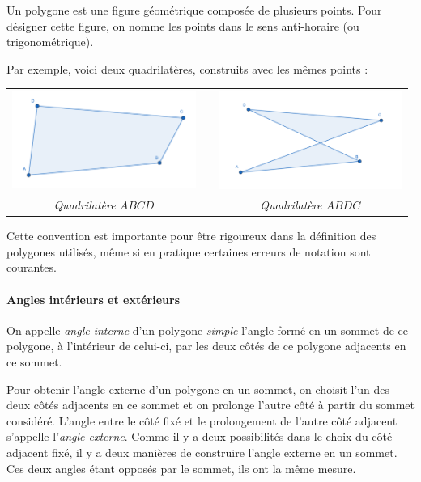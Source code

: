 \documentclass[a4paper, twoside]{article}
\begin{document}
Un polygone est une figure géométrique composée de plusieurs points.
Pour désigner cette figure, on nomme les points dans le sens anti-horaire (ou trigonométrique).

Par exemple, voici deux quadrilatères, construits avec les mêmes points :

\begin{center}
	\begin{tabular}{ccc}
		\includegraphics[width=6cm]{Image/Polygone ABCD.png} &               & \includegraphics[width=6cm]{Image/Polygone ABDC.png} \\
		\textit{Quadrilatère $ABCD$}                         & \phantom{cou} & \textit{Quadrilatère $ABDC$}                         \\
	\end{tabular}
\end{center}

Cette convention est importante pour être rigoureux dans la définition des polygones utilisés,
même si en pratique certaines erreurs de notation sont courantes.

\paragraph*{Angles intérieurs et extérieurs}

On appelle \emph{angle interne} d'un polygone \textit{simple}
l'angle formé en un sommet de ce polygone,
à l'intérieur de celui-ci,
par les deux côtés de ce polygone adjacents en ce sommet.

Pour obtenir l'angle externe d'un polygone en un sommet,
on choisit l'un des deux côtés adjacents en ce sommet et
on prolonge l'autre côté à partir du sommet considéré.
L'angle entre le côté fixé et le prolongement de l'autre côté adjacent
s'appelle l'\emph{angle externe}.
Comme il y a deux possibilités dans le choix du côté adjacent fixé,
il y a deux manières de construire l'angle externe en un sommet.
Ces deux angles étant opposés par le sommet, ils ont la même mesure.
\end{document}
